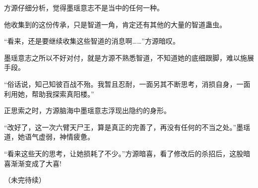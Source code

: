 \begin{this_body}
方源仔细分析，觉得墨瑶意志不是当中的任何一种。

他收集到的这份传承，只是智道一角，肯定还有其他的大量的智道蛊虫。

“看来，还是要继续收集这些智道的消息啊……”方源暗叹。

墨瑶意志之所以不好对付，就是方源不熟悉智道，不知道她的底细跟脚，难以施展手段。

“俗话说，知己知彼百战不殆。我暂且忍耐，一面另其不断思考，消损自身，一面利用她，帮助我探索真阳楼。”

正思索之时，方源脑海中墨瑶意志浮现出隐约的身形。

“改好了，这一次六臂天尸王，算是真正的完善了，再没有任何的不当之处。”墨瑶道，她语气虚弱，神情疲惫。

“看来这些天的思考，让她损耗了不少。”方源暗喜，看了修改后的杀招后，这股暗喜渐渐变成了大喜!

（未完待续）

\end{this_body}

